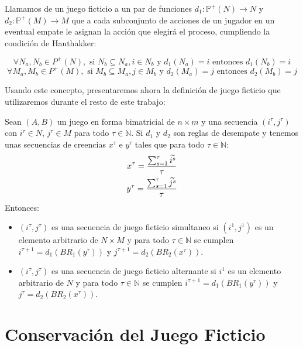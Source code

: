 \begin{definition}
    Llamamos  de un juego ficticio a un par de funciones $d_1: \mathbb{P}^+(N) \rightarrow N$ y $d_2: \mathbb{P}^+(M) \rightarrow M$ que a cada subconjunto de acciones de un jugador en un eventual empate le asignan la acción que elegirá el proceso, cumpliendo la condición de Hauthakker:

    \[
        \forall N_a, N_b \in {P}^+(N), \text{ si } N_b \subseteq N_a, i \in N_b \text{ y } d_1(N_a) = i  \text{ entonces } d_1(N_b) = i
    \]
    \[
        \forall M_a, M_b \in {P}^+(M), \text{ si } M_b \subseteq M_a, j \in M_b \text{ y } d_2(M_a) = j  \text{ entonces } d_2(M_b) = j
    \]
\end{definition}

Usando este concepto, presentaremos ahora la definición de juego ficticio que utilizaremos durante el resto de este trabajo:

\begin{definition} \label{def:fp:berger_desempate}
    Sean $(A, B)$ un juego en forma bimatricial de $n \times m$ y una secuencia $(i^\tau, j^\tau)$ con $i^\tau \in N$, $j^\tau \in M$ para todo $\tau \in \mathbb{N}$. Si $d_1$ y $d_2$ son reglas de desempate y tenemos unas secuencias de creencias $x^\tau$ e $y^\tau$ tales que para todo $\tau \in \mathbb{N}$:
    \begin{gather*}
        x^\tau= \frac{\sum^\tau_{s=1} \widetilde{i^s}}{\tau}  \\
        y^\tau= \frac{\sum^\tau_{s=1} \widetilde{j^s}}{\tau}
    \end{gather*}
    Entonces:
    \begin{itemize}
        \item $(i^\tau, j^\tau)$ es una secuencia de juego ficticio simultaneo si $(i^1, j^1)$ es un elemento arbitrario de $N \times M$ y para todo $\tau \in \mathbb{N}$ se cumplen $i^{\tau+1} = d_1(BR_1(y^\tau))$ y $j^{\tau+1} = d_2(BR_2(x^\tau))$.
        \item $(i^\tau, j^\tau)$ es una secuencia de juego ficticio alternante si $i^1$ es un elemento arbitrario de $N$ y para todo $\tau \in \mathbb{N}$ se cumplen $i^{\tau+1} = d_1(BR_1(y^\tau))$ y $j^{\tau} = d_2(BR_2(x^\tau))$.
    \end{itemize}
\end{definition}

\section{Conservación del Juego Ficticio}

